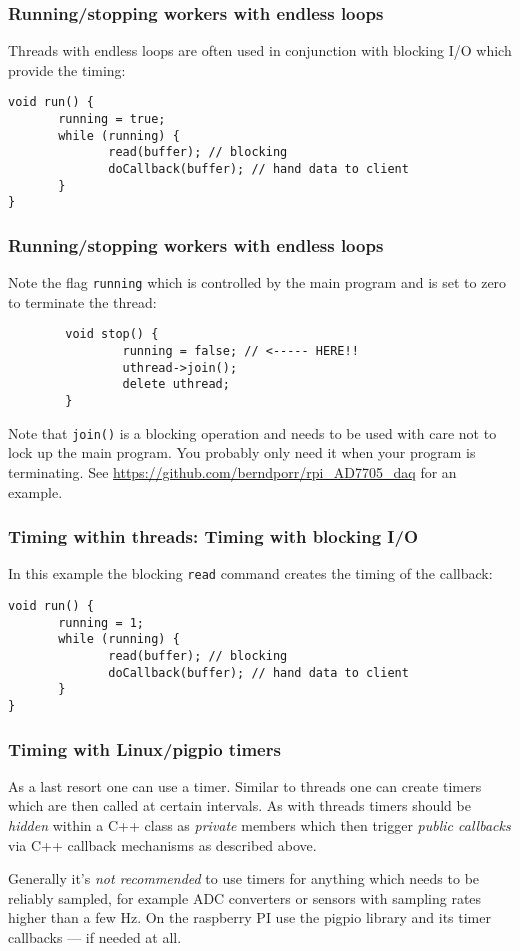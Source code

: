 \documentclass[xcolor=dvipsnames]{beamer}
\begin{document}
\begin{frame}[fragile]
\frametitle{Running/stopping workers with endless loops}
Threads with endless loops are often used in conjunction with blocking
I/O which provide the timing:
\begin{verbatim}
void run() {
       running = true;
       while (running) {
              read(buffer); // blocking
              doCallback(buffer); // hand data to client
       }
}
\end{verbatim}
\end{frame}


\begin{frame}[fragile]
\frametitle{Running/stopping workers with endless loops}
Note the flag \texttt{running} which is controlled by the main program and is set to zero to terminate
the thread:
\begin{verbatim}
        void stop() {
                running = false; // <----- HERE!!
                uthread->join();
                delete uthread;
        }
\end{verbatim}
Note that \texttt{join()} is a blocking operation and needs to be used with care not to
lock up the main program. You probably only need it when your program is terminating.
See \url{https://github.com/berndporr/rpi_AD7705_daq} for an example.
\end{frame}


\begin{frame}[fragile]
\frametitle{Timing within threads: Timing with blocking I/O}

In this example the blocking \texttt{read} command creates
the timing of the callback:
\begin{verbatim}
void run() {
       running = 1;
       while (running) {
              read(buffer); // blocking
              doCallback(buffer); // hand data to client
       }
}
\end{verbatim}
\end{frame}

\begin{frame}[fragile]
\frametitle{Timing with Linux/pigpio timers}
As a last resort one can use a timer. Similar to threads one can
create timers which are then called at certain intervals. As with threads
timers should be \textsl{hidden} within a C++ class as
\textsl{private} members which then trigger \textsl{public callbacks}
via C++ callback mechanisms as described above.

Generally it's \textsl{not recommended}
to use timers for anything which needs to be reliably sampled, for
example ADC converters or sensors with sampling rates higher than a
few Hz. On the raspberry PI use the pigpio library and its timer
callbacks --- if needed at all.
\end{frame}
\end{document}
